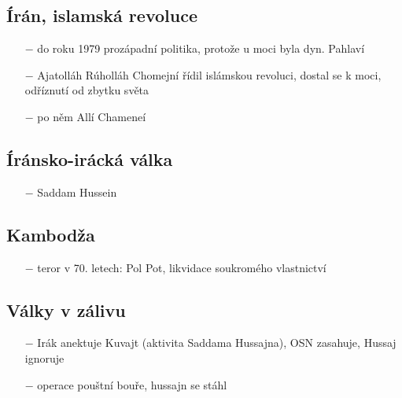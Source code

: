 \documentclass{article}
\begin{document}
\subsection*{Írán, islamská revoluce}
\begin{itemize}
    \vspace{-0.5em}
    \setlength\itemsep{0.15em}
    \item[$-$] do roku 1979 prozápadní politika, protože u moci byla dyn. Pahlaví
    \item[$-$] Ajatolláh Rúholláh Chomejní řídil islámskou revoluci, dostal se k moci, odříznutí od zbytku světa
    \item[$-$] po něm Allí Chameneí
\end{itemize}

\subsection*{Íránsko-irácká válka}
\begin{itemize}
    \vspace{-0.5em}
    \setlength\itemsep{0.15em}
    \item[$-$] Saddam Hussein
\end{itemize}

\subsection*{Kambodža}
\begin{itemize}
    \vspace{-0.5em}
    \setlength\itemsep{0.15em}
    \item[$-$] teror v 70. letech: Pol Pot, likvidace soukromého vlastnictví
\end{itemize}

\subsection*{Války v zálivu}

\begin{itemize}
    \vspace{-0.5em}
    \setlength\itemsep{0.15em}
    \item[$-$] Irák anektuje Kuvajt (aktivita Saddama Hussajna), OSN zasahuje, Hussaj ignoruje
    \item[$-$] operace pouštní bouře, hussajn se stáhl
\end{itemize}
\end{document}
